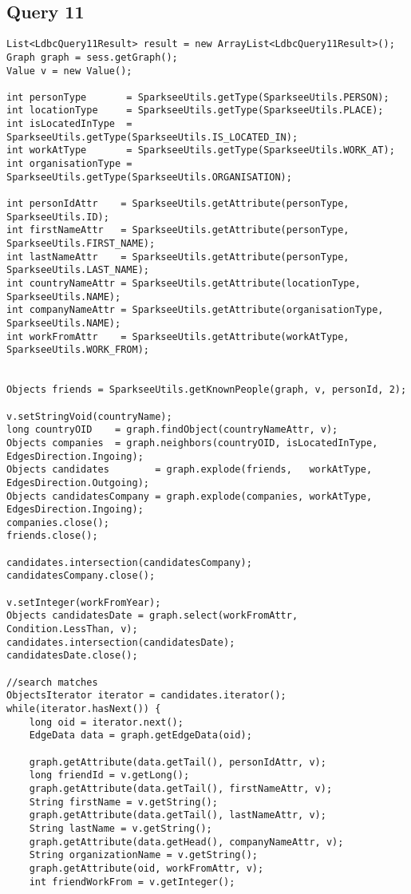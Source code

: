 \subsection{Query 11}

{\footnotesize
\begin{verbatim}
List<LdbcQuery11Result> result = new ArrayList<LdbcQuery11Result>();
Graph graph = sess.getGraph();
Value v = new Value();

int personType       = SparkseeUtils.getType(SparkseeUtils.PERSON);
int locationType     = SparkseeUtils.getType(SparkseeUtils.PLACE);
int isLocatedInType  = SparkseeUtils.getType(SparkseeUtils.IS_LOCATED_IN);
int workAtType       = SparkseeUtils.getType(SparkseeUtils.WORK_AT);
int organisationType = SparkseeUtils.getType(SparkseeUtils.ORGANISATION);

int personIdAttr    = SparkseeUtils.getAttribute(personType, SparkseeUtils.ID);
int firstNameAttr   = SparkseeUtils.getAttribute(personType, SparkseeUtils.FIRST_NAME);
int lastNameAttr    = SparkseeUtils.getAttribute(personType, SparkseeUtils.LAST_NAME);
int countryNameAttr = SparkseeUtils.getAttribute(locationType,     SparkseeUtils.NAME);
int companyNameAttr = SparkseeUtils.getAttribute(organisationType, SparkseeUtils.NAME);
int workFromAttr    = SparkseeUtils.getAttribute(workAtType,       SparkseeUtils.WORK_FROM);


Objects friends = SparkseeUtils.getKnownPeople(graph, v, personId, 2);

v.setStringVoid(countryName);
long countryOID    = graph.findObject(countryNameAttr, v);
Objects companies  = graph.neighbors(countryOID, isLocatedInType, EdgesDirection.Ingoing);
Objects candidates        = graph.explode(friends,   workAtType, EdgesDirection.Outgoing);
Objects candidatesCompany = graph.explode(companies, workAtType, EdgesDirection.Ingoing);
companies.close();
friends.close();

candidates.intersection(candidatesCompany);
candidatesCompany.close();

v.setInteger(workFromYear);
Objects candidatesDate = graph.select(workFromAttr, Condition.LessThan, v);
candidates.intersection(candidatesDate);
candidatesDate.close();

//search matches
ObjectsIterator iterator = candidates.iterator();
while(iterator.hasNext()) {
    long oid = iterator.next();
    EdgeData data = graph.getEdgeData(oid);

    graph.getAttribute(data.getTail(), personIdAttr, v);
    long friendId = v.getLong();
    graph.getAttribute(data.getTail(), firstNameAttr, v);
    String firstName = v.getString();
    graph.getAttribute(data.getTail(), lastNameAttr, v);
    String lastName = v.getString();
    graph.getAttribute(data.getHead(), companyNameAttr, v);
    String organizationName = v.getString();
    graph.getAttribute(oid, workFromAttr, v);
    int friendWorkFrom = v.getInteger();


\end{verbatim}}
